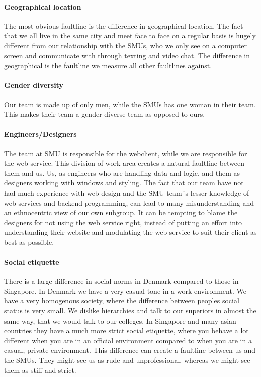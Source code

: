 \documentclass[a4paper,11pt,report]{article}
\begin{document}
\paragraph{Geographical location}
The most obvious faultline is the difference in geographical location. The fact that we all live in the same city and meet face to face on a regular basis is hugely different from our relationship with the SMUs, who we only see on a computer screen and communicate with through texting and video chat. The difference in geographical is the faultline we measure all other faultlines against.

\paragraph{Gender diversity}
Our team is made up of only men, while the SMUs has one woman in their team. This makes their team a gender diverse team as opposed to ours.

\paragraph{Engineers/Designers}
The team at SMU is responsible for the webclient, while we are responsible for the web-service. This division of work area creates a natural faultline between them and us. Us, as engineers who are handling data and logic, and them as designers working with windows and styling. The fact that our team have not had much experience with web-design and the SMU team´s lesser knowledge of web-services and backend programming, can lead to many misunderstanding and an ethnocentric view of our own subgroup. It can be tempting to blame the designers for not using the web service right, instead of putting an effort into understanding their website and modulating the web service to suit their client as best as possible.

\paragraph{Social etiquette}
There is a large difference in social norms in Denmark compared to those in Singapore. In Denmark we have a very casual tone in a work environment. We have a very homogenous society, where the difference between peoples social status is very small. We dislike hierarchies and talk to our superiors in almost the same way, that we would talk to our colleges. In Singapore and many asian countries they have a much more strict social etiquette, where you behave a lot different when you are in an official environment compared to when you are in a casual, private environment. This difference can create a faultline between us and the SMUs. They might see us as rude and unprofessional, whereas we might see them as stiff and strict. 
\end{document}
